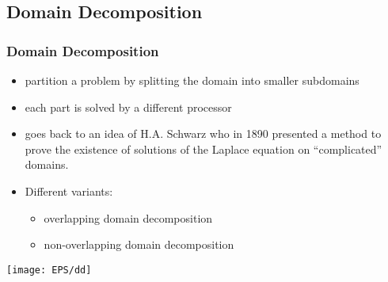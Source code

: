 \subsection{Domain Decomposition}
\begin{frame}
  \frametitle<presentation>{Domain Decomposition}

  \begin{itemize}
  \item partition a problem by splitting the domain into smaller subdomains
  \item each part is solved by a different processor
  \item goes back to an idea of H.A. Schwarz who in 1890 presented a method to prove the existence of
        solutions of the Laplace equation on ``complicated'' domains.
  \item Different variants:
    \begin{itemize}
    \item overlapping domain decomposition
    \item non-overlapping domain decomposition
    \end{itemize}
  \end{itemize}

  \begin{center}
    \texttt{[image: EPS/dd]}
  \end{center}

\end{frame}


